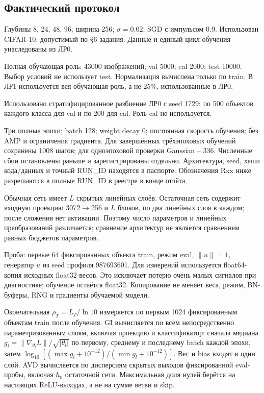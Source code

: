 \subsection{Фактический протокол}

Глубины 8, 24, 48, 96; ширина 256; $\sigma=0.02$; SGD с импульсом 0.9. Использован CIFAR-10, допустимый по §6 задания. Данные и единый цикл обучения унаследованы из ЛР0.


Полная обучающая роль: 43000 изображений; val 5000; cal 2000; test 10000. Выбор условий не использует test. Нормализация вычислена только по train. В ЛР1 используется вся обучающая роль, а не 25\%, использованные в ЛР0.

Использовано стратифицированное разбиение ЛР0 с seed 1729: по 500 объектов каждого класса для val и по 200 для cal. Роль cal не используется.

Три полные эпохи; batch 128; weight decay 0; постоянная скорость обучения; без AMP и ограничения градиента. Для завершённых трёхэпоховых обучений сохранены 1008 шагов; для одноэпоховой проверки Gaussian -- 336. Численные сбои остановлены раньше и зарегистрированы отдельно. Архитектура, seed, хеши кода/данных и точный RUN\_ID находятся в паспорте. Обозначения Rxx ниже разрешаются в полные RUN\_ID в реестре в конце отчёта.

Обычная сеть имеет $L$ скрытых линейных слоёв. Остаточная сеть содержит входную проекцию 3072$\to$256 и $L$ блоков, по два линейных слоя в каждом; после сложения нет активации. Поэтому число параметров и линейных преобразований различается; сравнение архитектур не является сравнением равных бюджетов параметров.

Проба: первые 64 фиксированных объекта train, режим eval, $\|u\|=1$, генератор $u$ из seed профиля 987693601. Для измерений используется float64-копия исходных float32-весов. Это исключает потерю очень малых сигналов при диагностике; обучение остаётся float32. Копирование не меняет веса, режим, BN-буферы, RNG и градиенты обучаемой модели.

Окончательная $\rho_T=L_T/\ln10$ измеряется по первым 1024 фиксированным объектам train после обучения. GI вычисляется по всем непосредственно параметризованным слоям, включая проекцию и классификатор: сначала медиана $g_l=\|\nabla_{\theta_l}L\|/\sqrt{|\theta_l|}$ по первому, среднему и последнему batch каждой эпохи, затем $\log_{10}[(\max g_l+10^{-12})/(\min g_l+10^{-12})]$. Вес и bias входят в один слой. AVD вычисляется по дисперсиям скрытых выходов фиксированной eval-пробы, включая $h_0$ остаточной сети. Максимальная доля нулей берётся на настоящих ReLU-выходах, а не на сумме ветви и skip.

